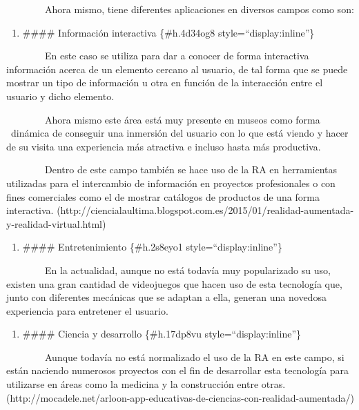 ~~~~~~~~Ahora mismo, tiene diferentes aplicaciones en diversos campos
como son:

\begin{enumerate}
\def\labelenumi{\arabic{enumi}.}
\itemsep1pt\parskip0pt
\item
  \#\#\#\# Información interactiva \{\#h.4d34og8
  style=``display:inline''\}
\end{enumerate}

~~~~~~~~En este caso se utiliza para dar a conocer de forma interactiva
información acerca de un elemento cercano al usuario, de tal forma que
se puede mostrar un tipo de información u otra en función de la
interacción entre el usuario y dicho elemento.

~~~~~~~~Ahora mismo este área está muy presente en museos como forma
~dinámica de conseguir una inmersión del usuario con lo que está viendo
y hacer de su visita una experiencia más atractiva e incluso hasta más
productiva.

~~~~~~~~Dentro de este campo también se hace uso de la RA en
herramientas utilizadas para el intercambio de información en proyectos
profesionales o con fines comerciales como el de mostrar catálogos de
productos de una forma interactiva.
(http://ciencialaultima.blogspot.com.es/2015/01/realidad-aumentada-y-realidad-virtual.html)

\begin{enumerate}
\def\labelenumi{\arabic{enumi}.}
\setcounter{enumi}{1}
\itemsep1pt\parskip0pt
\item
  \#\#\#\# Entretenimiento \{\#h.2s8eyo1 style=``display:inline''\}
\end{enumerate}

~~~~~~~~En la actualidad, aunque no está todavía muy popularizado su
uso, existen una gran cantidad de videojuegos que hacen uso de esta
tecnología que, junto con diferentes mecánicas que se adaptan a ella,
generan una novedosa experiencia para entretener el usuario.

\begin{enumerate}
\def\labelenumi{\arabic{enumi}.}
\setcounter{enumi}{2}
\itemsep1pt\parskip0pt
\item
  \#\#\#\# Ciencia y desarrollo \{\#h.17dp8vu style=``display:inline''\}
\end{enumerate}

~~~~~~~~Aunque todavía no está normalizado el uso de la RA en este
campo, si están naciendo numerosos proyectos con el fin de desarrollar
esta tecnología para utilizarse en áreas como la medicina y la
construcción entre otras.
(http://mocadele.net/arloon-app-educativas-de-ciencias-con-realidad-aumentada/)

